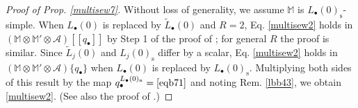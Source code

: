 \documentclass[11pt,b5paper,notitlepage]{article}
\theoremstyle{definition}
\theoremstyle{plain}
\newcommand{\wtd}{\widetilde}
\newcommand{\End}{\mathrm{End}} %
\newcommand{\scr}{\mathscr}
\newcommand{\blt}{\bullet}
\newcommand{\Mbb}{\mathbb M}
\newcommand{\btl}{\blacktriangleleft}
\newcommand{\btr}{\blacktriangleright}
\newcommand{\Ljss}{{L_j(0)_\mathrm{s}}}
\newcommand{\Ljni}{{L_j(0)_\mathrm{n}}}
\newcommand{\<}{\left\langle}
\renewcommand{\>}{\right\rangle}
\newcommand{\MU}{\mathcal{U}}
\newcommand{\Lbni}{{L_\bullet(0)_\mathrm{n}}}
\newcommand{\Lbss}{{L_\bullet(0)_\mathrm{s}}}
\numberwithin{equation}{subsection}
\begin{document}
\begin{proof}[Proof of Prop. \ref{multisew7}]
Without loss of generality, we assume $\Mbb$ is $\Lbss$-simple. When $L_\blt(0)$ is replaced by $\wtd L_\blt(0)$ and $R=2$, Eq. \eqref{multisew2} holds in $(\Mbb\otimes \Mbb'\otimes \scr A)[[q_\blt]]$ by Step 1 of the proof of \cite[Prop. 2.3.10]{GZ1}; for general $R$ the proof is similar. Since $\wtd L_j(0)$ and $\Ljss$ differ by a scalar, Eq. \eqref{multisew2} holds in $(\Mbb\otimes \Mbb'\otimes \scr A)\{q_\blt\}$ when $L_\blt(0)$ is replaced by $\Lbss$. Multiplying both sides of this result by the map $q_\blt^{\Lbni}=\eqref{eqb71} $ and noting Rem. \ref{lbb43}, we obtain \eqref{multisew2}. (See also the proof of \cite[Lem. 10.2]{Gui-sewingconvergence}.)
\end{proof}

\begin{comment}
\begin{proof}
    Without loss of generality, we may assume $\Mbb$ is $\Ljss$-simple for each $1\leq j\leq R$. Then we have $L_j(0)=\Ljss+\Ljni=\wtd L_j(0)+\lambda_j+\Ljni$. Note that $L_j(0)$ and $L_k(0)_{\mathrm{n}}$ commute with $Y_{\Mbb,k}$ for $j\ne k$. We obtain
    \begin{align*}
    \big(Y_{\Mbb,k}(\xi_k^{L(0)}u,\xi_k)q_\blt^{\wtd L_\blt(0)}\big)^t=Y_{\Mbb',k}\big((q_k/\xi_k)^{L(0)}\MU(\upgamma_1)u,q_k/\xi_k\big)q_\blt^{\wtd L_\blt (0)}
    \end{align*}
    in $\End(\Mbb')[[\xi_k^{\pm 1},q_k^{\pm 1},q_{\blt \backslash k}]]$. This implies that 
    \begin{align*}
        Y_{\Mbb,k}(\xi_k^{L(0)}u,\xi_k)q_\blt^{\wtd L_\blt(0)}\btr\otimes \btl
        =q_\blt^{\wtd L_\blt(0)}\btr\otimes Y_{\Mbb',k}\big((q_k/\xi_k)^{L(0)}\MU(\upgamma_1)u,q_k/\xi_k\big)\btl
    \end{align*}
    in $(\Mbb\otimes \Mbb')[[\xi_k^{\pm 1},q_k^{\pm 1},q_{\blt \backslash k}]]$.


\end{comment}
\end{document}
